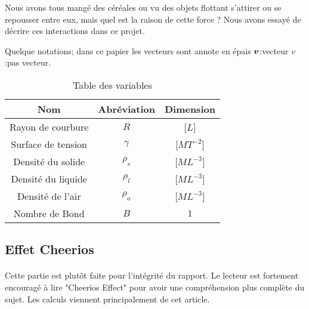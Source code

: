 Nous avons tous mangé des céréales ou vu des objets flottant s'attirer ou se repousser entre eux, mais quel est la raison de cette force ? Nous avons essayé de décrire ces interactions dans ce projet.

Quelque notations; dans ce papier les vecteurs sont annote en épais $\vb*{v}$:vecteur $v$:pas vecteur.
\begin{table}[H]
    \centering
    \begin{tabular}{ccc}
        \hline
        Nom                & Abréviation & Dimension\\
        \hline
        Rayon de courbure  & $R$         & [$L$]\\
        Surface de tension & $\gamma$    & [$MT^{-2}$]\\ 
        Densité du solide  & $\rho_s$    & [$ML^{-3}$]\\
        Densité du liquide & $\rho_l$    & [$ML^{-3}$]\\
        Densité de l'air   & $\rho_a$    & [$ML^{-3}$]\\
        Nombre de Bond     & $B$         & $1$\\
        \hline
    \end{tabular}
    \caption{Table des variables}
\end{table}

\subsection{Effet Cheerios}
    \paragraph*{}{
        Cette partie est plutôt faite pour l'intégrité du rapport. Le lecteur est fortement encouragé à lire "Cheerios Effect"\cite{vella_cheerios_2005} pour avoir une compréhension plus complète du sujet. Les calculs viennent principalement de cet article.
    }    %


